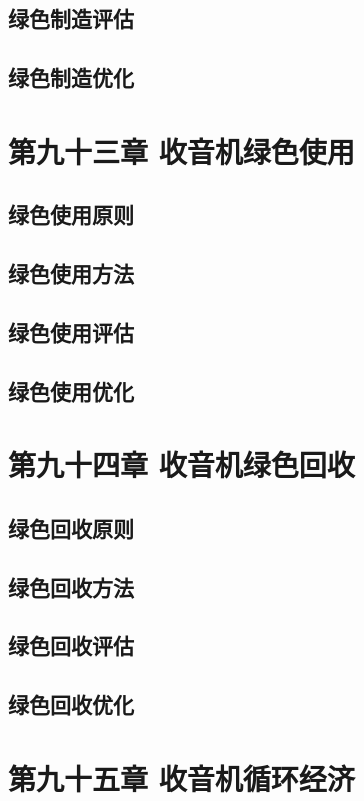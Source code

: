 \documentclass[12pt,UTF8]{ctexbook}
\begin{document}
\section{绿色制造评估}
\section{绿色制造优化}

\chapter{第九十三章 收音机绿色使用}

\section{绿色使用原则}
\section{绿色使用方法}
\section{绿色使用评估}
\section{绿色使用优化}

\chapter{第九十四章 收音机绿色回收}

\section{绿色回收原则}
\section{绿色回收方法}
\section{绿色回收评估}
\section{绿色回收优化}

\chapter{第九十五章 收音机循环经济}
\end{document}
